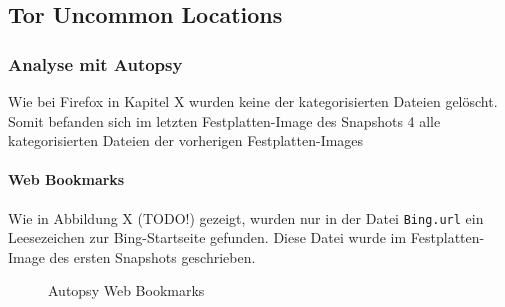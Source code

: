 \begin{appendices}


\subsection*{Tor Uncommon Locations}

\subsubsection*{Analyse mit Autopsy}

Wie bei Firefox in Kapitel X wurden keine der kategorisierten Dateien gelöscht. Somit befanden sich im letzten Festplatten-Image des Snapshots 4 alle kategorisierten Dateien der vorherigen Festplatten-Images

\paragraph*{Web Bookmarks}
Wie in Abbildung X (TODO!) gezeigt, wurden nur in der Datei \texttt{Bing.url} ein Leesezeichen zur Bing-Startseite gefunden. Diese Datei wurde im Festplatten-Image des ersten Snapshots geschrieben.
\begin{figure}[h!]
	\centerline{}
	\label{chart:final-criteria}  
	\caption{Autopsy Web Bookmarks}
\end{figure}


\end{appendices}
